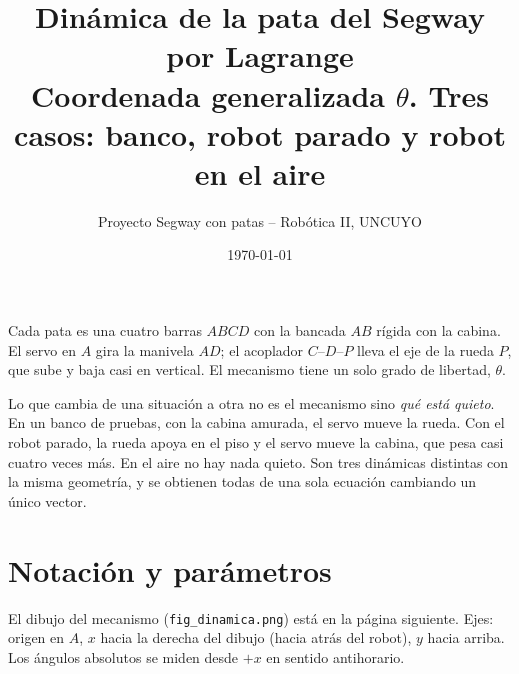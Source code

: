\documentclass[11pt,a4paper]{article}
\title{Dinámica de la pata del Segway por Lagrange\\
\large Coordenada generalizada \(\theta\). Tres casos: banco, robot parado y robot en el aire}
\author{Proyecto Segway con patas -- Robótica II, UNCUYO}
\date{\today}
\begin{document}
\maketitle

Cada pata es una cuatro barras \(ABCD\) con la bancada \(AB\) rígida con la cabina. El servo en \(A\) gira la
manivela \(AD\); el acoplador \(C\)--\(D\)--\(P\) lleva el eje de la rueda \(P\), que sube y baja casi en
vertical. El mecanismo tiene un solo grado de libertad, \(\theta\).

Lo que cambia de una situación a otra no es el mecanismo sino \emph{qué está quieto}. En un banco de pruebas,
con la cabina amurada, el servo mueve la rueda. Con el robot parado, la rueda apoya en el piso y el servo
mueve la cabina, que pesa casi cuatro veces más. En el aire no hay nada quieto. Son tres dinámicas distintas con
la misma geometría, y se obtienen todas de una sola ecuación cambiando un único vector.

\section{Notación y parámetros}

El dibujo del mecanismo (\texttt{fig\_dinamica.png}) está en la página siguiente. Ejes: origen en \(A\), \(x\)
hacia la derecha del dibujo (hacia atrás del robot), \(y\) hacia arriba. Los ángulos absolutos se miden desde
\(+x\) en sentido antihorario.
\end{document}
